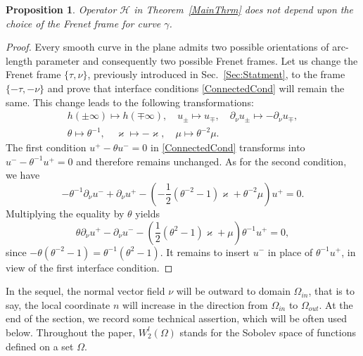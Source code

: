 \documentclass[reqno]{amsart}
\theoremstyle{plain}
\newtheorem{prop}{Proposition}
\numberwithin{equation}{section}
\renewcommand{\kappa}{\varkappa}
\begin{document}
\begin{prop}\label{PropInvarianceOfCnds}
  Operator $\mathcal{H}$ in Theorem~\ref{MainThrm} does not depend upon the choice of the Frenet frame for curve $\gamma$.
\end{prop}
\begin{proof}
Every smooth curve in the plane admits two possible orientations of arc-length parameter and consequently two possible  Frenet frames. Let us change the Frenet frame $\{\tau, \nu\}$, previously introduced in Sec.~\ref{Sec:Statment}, to the frame $\{-\tau, -\nu\}$ and prove that
interface conditions \eqref{ConnectedCond} will remain the same. This change leads to the following transformations:
\begin{gather*}
h(\pm\infty)\mapsto h(\mp\infty), \quad u_\pm\mapsto u_\mp, \quad \partial_\nu u_\pm \mapsto -\partial_\nu u_\mp,\\
\theta\mapsto \theta^{-1}, \quad \kappa\mapsto -\kappa,\quad \mu\mapsto \theta^{-2}\mu.
\end{gather*}
The first condition $u^+-\theta u^-=0$ in \eqref{ConnectedCond} transforms into $u^--\theta^{-1} u^+=0$ and therefore remains unchanged. As for the second condition, we have
\begin{equation*}
 	-\theta^{-1}\partial_\nu u^-+\partial_\nu u^+
	-\left(-\textstyle\frac{1}{2}(\theta^{-2}-1)\kappa
	+\theta^{-2}\mu\right) u^+=0.
\end{equation*}
Multiplying the equality by $\theta$  yields
\begin{equation*}
	\theta\partial_\nu u^+-\partial_\nu u^-
	-\left(\textstyle\frac{1}{2 }(\theta^{2}-1)\kappa+\mu\right) 	\theta^{-1} u^+=0,
\end{equation*}
since $-\theta(\theta^{-2}-1)=\theta^{-1}(\theta^{2}-1)$. It remains to insert $u^-$ in place of $\theta^{-1} u^+$, in view of the first interface condition.
\end{proof}

In the sequel, the normal vector field $\nu$ will be outward to domain $\Omega_{in}$, that is to say, the local coordinate $n$ will increase in the direction from $\Omega_{in}$ to $\Omega_{out}$.
At the end of the section,  we record some technical assertion, which  will be often used below.
Throughout the paper, $W_2^l(\Omega)$ stands for the Sobolev space of functions defined on a set $\Omega$.
\end{document}
